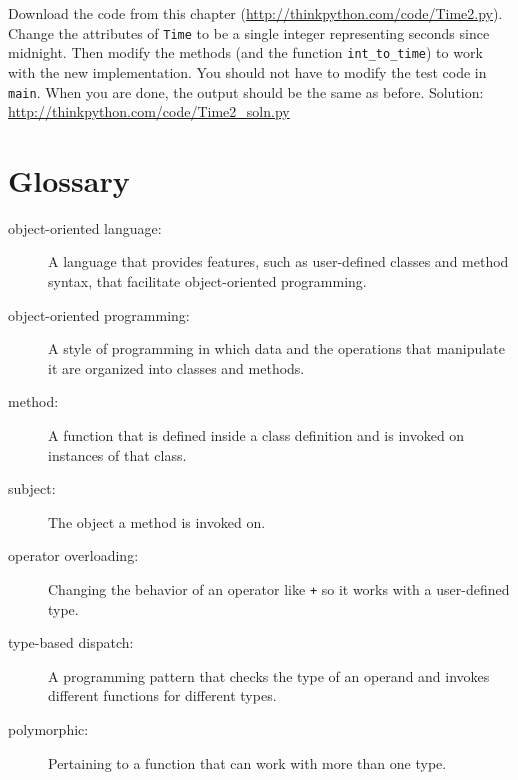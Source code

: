 \documentclass[10pt]{book}
\begin{document}
\begin{CJK}{UTF8}{gbsn}
\begin{exercise}

Download the code from this chapter
(\url{http://thinkpython.com/code/Time2.py}).  Change the attributes
of {\tt Time} to be a single integer representing seconds since
midnight.  Then modify the methods (and the function
\verb"int_to_time") to work with the new implementation.  You should
not have to modify the test code in {\tt main}.  When you are done,
the output should be the same as before.  Solution:
\url{http://thinkpython.com/code/Time2_soln.py}

\end{exercise}


\section{Glossary}

\begin{description}

\item[object-oriented language:] A language that provides features,
  such as user-defined classes and method syntax, that facilitate
  object-oriented programming.

\item[object-oriented programming:] A style of programming in which
data and the operations that manipulate it are organized into classes
and methods.

\item[method:] A function that is defined inside a class definition and
is invoked on instances of that class.

\item[subject:] The object a method is invoked on.

\item[operator overloading:] Changing the behavior of an operator like
{\tt +} so it works with a user-defined type.

\item[type-based dispatch:] A programming pattern that checks the type
of an operand and invokes different functions for different types.

\item[polymorphic:] Pertaining to a function that can work with more
  than one type.  


\end{description}
\end{CJK}
\end{document}
